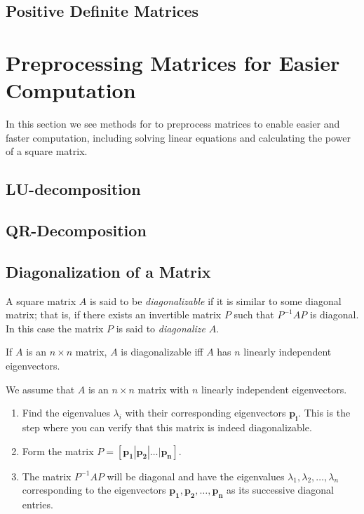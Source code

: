 \documentclass{report}
\begin{document}
		\subsection{Positive Definite Matrices}%
		
	
	\section{Preprocessing Matrices for Easier Computation}
	In this section we see methods for to preprocess matrices to enable easier and faster computation, including solving linear equations and calculating the power of a square matrix.
	
		\subsection{LU-decomposition}%
		
		\subsection{QR-Decomposition}%
		
		\subsection{Diagonalization of a Matrix}
			\begin{defn}[Diagonalizablility]
				A square matrix $A$ is said to be \emph{diagonalizable} if it is similar to some diagonal matrix; that is, if there exists an invertible matrix $P$ such that $P^{-1}AP$ is diagonal. In this case the matrix $P$ is said to \emph{diagonalize} $A$.
			\end{defn}
			
			\begin{thm}
				If $A$ is an $n \times n$ matrix, $A$ is diagonalizable iff $A$ has $n$ linearly independent eigenvectors.
			\end{thm}
			
			\begin{mthd}
				We assume that $A$ is an $n \times n$ matrix with $n$ linearly independent eigenvectors.
				\begin{enumerate}
					\item Find the eigenvalues $\lambda_i$ with their corresponding eigenvectors $\bm{p_i}$. This is the step where you can verify that this matrix is indeed diagonalizable.
					\item Form the matrix $P=[\bm{p_1} | \bm{p_2} | \dots | \bm{p_n}]$.
					\item The matrix $P^{-1}AP$ will be diagonal and have the eigenvalues $\lambda_1, \lambda_2, \dots, \lambda_n$ corresponding to the eigenvectors $\bm{p_1},\bm{p_2},\dots,\bm{p_n}$ as its successive diagonal entries.
				\end{enumerate}
			\end{mthd}
			
\end{document}
